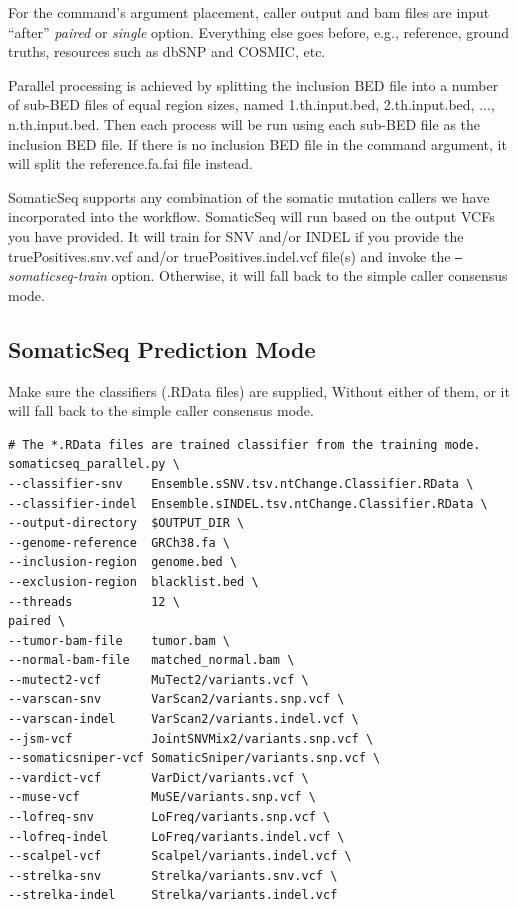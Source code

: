 \documentclass[10pt,letterpaper]{article}
\begin{document}
\begin{sloppypar}
For the command's argument placement, caller output and bam files are input ``after'' \textit{paired} or \textit{single} option. Everything else goes before, e.g., reference, ground truths, resources such as dbSNP and COSMIC, etc. 

Parallel processing is achieved by splitting the inclusion BED file into a number of sub-BED files of equal region sizes, named 1.th.input.bed, 2.th.input.bed, ..., n.th.input.bed. Then each process will be run using each sub-BED file as the inclusion BED file. If there is no inclusion BED file in the command argument, it will split the reference.fa.fai file instead. 

SomaticSeq supports any combination of the somatic mutation callers we have incorporated into the workflow. SomaticSeq will run based on the output VCFs you have provided. It will train for SNV and/or INDEL if you provide the truePositives.snv.vcf and/or truePositives.indel.vcf file(s) and invoke the \textit{\texttt{--}somaticseq-train} option. Otherwise, it will fall back to the simple caller consensus mode.




\subsection{SomaticSeq Prediction Mode} \label{somaticseq_prediction}

Make sure the classifiers (.RData files) are supplied, Without either of them, or it will fall back to the simple caller consensus mode.


\begin{lstlisting}
# The *.RData files are trained classifier from the training mode.
somaticseq_parallel.py \
--classifier-snv    Ensemble.sSNV.tsv.ntChange.Classifier.RData \
--classifier-indel  Ensemble.sINDEL.tsv.ntChange.Classifier.RData \
--output-directory  $OUTPUT_DIR \
--genome-reference  GRCh38.fa \
--inclusion-region  genome.bed \
--exclusion-region  blacklist.bed \
--threads           12 \
paired \
--tumor-bam-file    tumor.bam \
--normal-bam-file   matched_normal.bam \
--mutect2-vcf       MuTect2/variants.vcf \
--varscan-snv       VarScan2/variants.snp.vcf \
--varscan-indel     VarScan2/variants.indel.vcf \
--jsm-vcf           JointSNVMix2/variants.snp.vcf \
--somaticsniper-vcf SomaticSniper/variants.snp.vcf \
--vardict-vcf       VarDict/variants.vcf \
--muse-vcf          MuSE/variants.snp.vcf \
--lofreq-snv        LoFreq/variants.snp.vcf \
--lofreq-indel      LoFreq/variants.indel.vcf \
--scalpel-vcf       Scalpel/variants.indel.vcf \
--strelka-snv       Strelka/variants.snv.vcf \
--strelka-indel     Strelka/variants.indel.vcf
\end{lstlisting}




\end{sloppypar}
\end{document}
